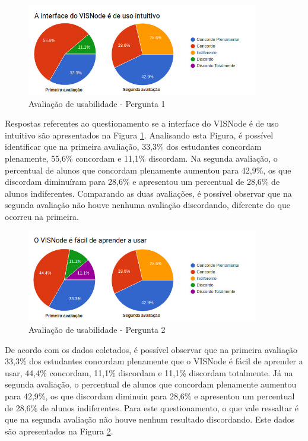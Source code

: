 \documentclass[
	12pt,				%
	oneside,			%
	a4paper,			%
	english,			%
	french,				%
	spanish,			%
	brazil,				%
	]{abntex2}
\begin{document}
\begin{figure}[H]
\centering
\caption{Avaliação de usabilidade - Pergunta 1}\label{fig:avaliacaoUsabilidade1}
\includegraphics[width=0.9\textwidth]{imagens/avaliacoes/avaliacao_usabilidade_1.jpg}
\sourceAuthor
\end{figure}

Respostas referentes ao questionamento  se a interface do VISNode é de uso intuitivo são apresentados na Figura \ref{fig:avaliacaoUsabilidade1}. Analisando esta Figura, é possível identificar que na primeira avaliação, 33,3\% dos estudantes concordam plenamente, 55,6\% concordam e 11,1\% discordam. Na segunda avaliação, o percentual de alunos que concordam plenamente aumentou para 42,9\%, os que discordam diminuíram para 28,6\% e apresentou um percentual de 28,6\% de alunos indiferentes. Comparando as duas avaliações, é possível observar que na segunda avaliação não houve nenhuma avaliação discordando, diferente do que ocorreu na primeira.

\begin{figure}[H]
\centering
\caption{Avaliação de usabilidade - Pergunta 2}\label{fig:avaliacaoUsabilidade2}
\includegraphics[width=0.9\textwidth]{imagens/avaliacoes/avaliacao_usabilidade_2.jpg}
\sourceAuthor
\end{figure}

De acordo com os dados coletados, é possível observar que na primeira avaliação 33,3\% dos estudantes concordam plenamente que o VISNode é fácil de aprender a usar, 44,4\% concordam, 11,1\% discordam e 11,1\% discordam totalmente. Já na segunda avaliação, o percentual de alunos que concordam plenamente aumentou para 42,9\%, os que discordam diminuiu para 28,6\% e apresentou um percentual de 28,6\% de alunos indiferentes. Para este questionamento, o que vale ressaltar é que na segunda avaliação não houve nenhum resultado discordando. Este dados são apresentados na Figura \ref{fig:avaliacaoUsabilidade2}.
\end{document}
